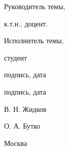 \begin{titlepage}
\vspace{3em}

\begin{center}

    \begin{flushleft}
        Руководитель темы,

        к.т.н., доцент. 

        \vspace{1.5em}

        Исполнитель темы,

        студент        
    \end{flushleft}

    \vspace{-9em}

    \begin{center}
        \underline{\hspace{3.5cm}}

        \vspace{-0.5em}
        подпись, дата

        \vspace{1.5em}

        \underline{\hspace{3.5cm}}

        \vspace{-0.5em}

        подпись, дата
    \end{center}

    \vspace{-10em}

    \begin{flushright}
        В. Н. Жидков

        \vspace{3em}

        О. А. Бутко
    \end{flushright}
\end{center}


\vspace{\fill}

\begin{center}
    Москва
\end{center}

\end{titlepage}
